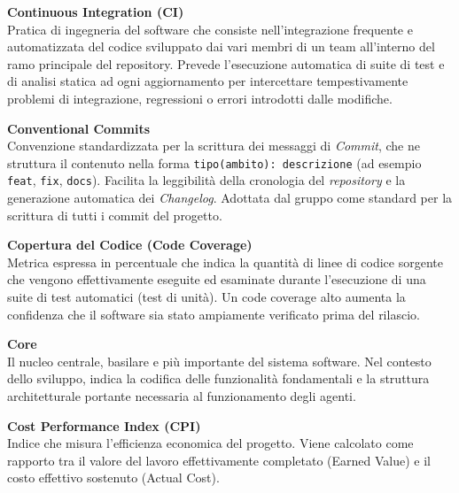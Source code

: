 \documentclass[12pt, a4paper]{article}
\begin{document}
\noindent\hypertarget{continuous-integration}{\textbf{Continuous Integration (CI)}} \\[0.1em]
Pratica di ingegneria del software che consiste nell'integrazione frequente e automatizzata del codice sviluppato dai vari membri di un team all'interno del ramo principale del repository. Prevede l'esecuzione automatica di suite di test e di analisi statica ad ogni aggiornamento per intercettare tempestivamente problemi di integrazione, regressioni o errori introdotti dalle modifiche.
\vspace{0.5cm}

\noindent\hypertarget{conventional-commits}{\textbf{Conventional Commits}} \\[0.1em]
Convenzione standardizzata per la scrittura dei messaggi di \textit{Commit}, che ne struttura il contenuto nella forma \texttt{tipo(ambito): descrizione} (ad esempio \texttt{feat}, \texttt{fix}, \texttt{docs}). Facilita la leggibilità della cronologia del \textit{repository} e la generazione automatica dei \textit{Changelog}. Adottata dal gruppo come standard per la scrittura di tutti i commit del progetto.
\vspace{0.5cm}

\noindent\hypertarget{copertura-del-codice}{\textbf{Copertura del Codice (Code Coverage)}} \\[0.1em]
Metrica espressa in percentuale che indica la quantità di linee di codice sorgente che vengono effettivamente eseguite ed esaminate durante l'esecuzione di una suite di test automatici (test di unità). Un code coverage alto aumenta la confidenza che il software sia stato ampiamente verificato prima del rilascio.
\vspace{0.1cm}

\noindent\hypertarget{core}{\textbf{Core}} \\[0.1em]
Il nucleo centrale, basilare e più importante del sistema software. Nel contesto dello sviluppo, indica la codifica delle funzionalità fondamentali e la struttura architetturale portante necessaria al funzionamento degli agenti.
\vspace{0.5cm}

\noindent\hypertarget{cost-performance-index}{\textbf{Cost Performance Index (CPI)}} \\[0.1em]
Indice che misura l'efficienza economica del progetto. Viene calcolato come rapporto tra il valore del lavoro effettivamente completato (Earned Value) e il costo effettivo sostenuto (Actual Cost).
\vspace{0.5cm}
\end{document}
